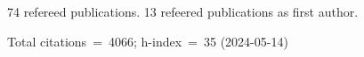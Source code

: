74 refereed publications. 13 refeered publications as first author.

Total citations~=~4066; h-index~=~35 (2024-05-14)